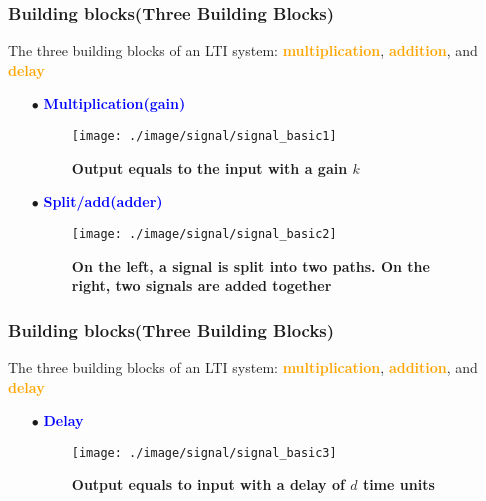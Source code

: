 \documentclass{beamer}
\newcommand{\blue}[1]{\textcolor{blue}{#1}}
\newcommand{\orange}[1]{\textcolor{orange}{#1}}
\begin{document}
\begin{frame}


\frametitle{Building blocks(Three Building Blocks)}
The three building blocks of an LTI system: \orange{\bf multiplication}, \orange{\bf addition}, and \orange{\bf delay}

\begin{itemize} \itemsep1pt \parskip0pt 
  \item[$\bullet$] \blue{\bf Multiplication(gain)}
  \item[]
  \begin{figure}[H]
  \centering
  \texttt{[image: ./image/signal/signal\_basic1]}
  \caption{\bf Output equals to the input with a gain $k$}
  \end{figure}
  \item[$\bullet$] \blue{\bf Split/add(adder)}
  \item[]
  \begin{figure}[H]
  \centering
  \texttt{[image: ./image/signal/signal\_basic2]}
  \caption{\bf  On the left, a signal is split into two paths. On the right, two signals are added together}
  \end{figure}
\end{itemize}


\end{frame}



\begin{frame}


\frametitle{Building blocks(Three Building Blocks)}
The three building blocks of an LTI system: \orange{\bf multiplication}, \orange{\bf addition}, and \orange{\bf delay}

\begin{itemize} \itemsep1pt \parskip0pt 
  \item[$\bullet$] \blue{\bf Delay}\newline
  \item[]
  \begin{figure}[H]
  \centering
  \texttt{[image: ./image/signal/signal\_basic3]}
  \caption{\bf Output equals to input with a delay of $d$ time units}
  \end{figure}
\end{itemize}


\end{frame}
\end{document}
